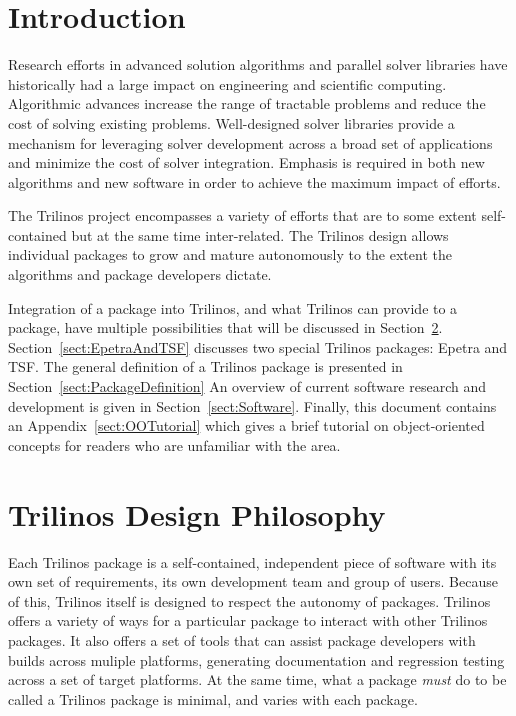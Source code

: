 \documentclass[12pt,relax]{SANDreport}
\begin{document}
\section{Introduction}

Research efforts in advanced solution algorithms and parallel solver
libraries have historically had a large impact on engineering and
scientific computing.  Algorithmic advances increase the range
of tractable problems and reduce the cost of solving existing
problems.  Well-designed solver libraries provide a mechanism for
leveraging solver development across a broad set of applications and
minimize the cost of solver integration.  Emphasis is
required in both new algorithms and new software in order
to achieve the maximum impact of efforts.

The Trilinos project encompasses a variety of efforts that are to some
extent self-contained but at the same time inter-related.  The
Trilinos design allows individual packages to grow and mature
autonomously to the extent the algorithms and package developers
dictate. 

Integration of a package into Trilinos, and what Trilinos can provide
to a package, have multiple possibilities
that will be discussed in Section~\ref{sect:TrilinosDesign}.
Section~\ref{sect:EpetraAndTSF} discusses two special Trilinos
packages: Epetra and TSF.  The general definition of a Trilinos
package is presented in Section~\ref{sect:PackageDefinition}
An overview of current software research and
development is given in Section~\ref{sect:Software}.  
Finally, this document contains
an Appendix~\ref{sect:OOTutorial} which gives a brief
tutorial on object-oriented concepts for readers who are unfamiliar
with the area.  

\section{Trilinos Design Philosophy}
\label{sect:TrilinosDesign}
Each Trilinos package is a self-contained, independent piece
of software with its own set of requirements, its own development team
and group of users.  Because of this,
Trilinos itself is designed to respect the autonomy of packages.
Trilinos offers a variety of ways for a particular package to interact with other
Trilinos packages.  It also offers a set of tools that can
assist package developers with builds across muliple platforms, generating
documentation and regression testing across a set of target platforms.
At the same time, what a package {\it must} do to be called a Trilinos
package is minimal, and varies with each package.
\end{document}
